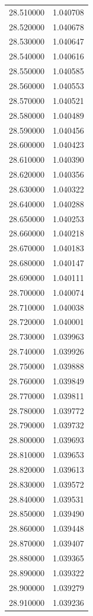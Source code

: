 \begin{tabular}{rr}
28.510000 & 1.040708 \\
28.520000 & 1.040678 \\
28.530000 & 1.040647 \\
28.540000 & 1.040616 \\
28.550000 & 1.040585 \\
28.560000 & 1.040553 \\
28.570000 & 1.040521 \\
28.580000 & 1.040489 \\
28.590000 & 1.040456 \\
28.600000 & 1.040423 \\
28.610000 & 1.040390 \\
28.620000 & 1.040356 \\
28.630000 & 1.040322 \\
28.640000 & 1.040288 \\
28.650000 & 1.040253 \\
28.660000 & 1.040218 \\
28.670000 & 1.040183 \\
28.680000 & 1.040147 \\
28.690000 & 1.040111 \\
28.700000 & 1.040074 \\
28.710000 & 1.040038 \\
28.720000 & 1.040001 \\
28.730000 & 1.039963 \\
28.740000 & 1.039926 \\
28.750000 & 1.039888 \\
28.760000 & 1.039849 \\
28.770000 & 1.039811 \\
28.780000 & 1.039772 \\
28.790000 & 1.039732 \\
28.800000 & 1.039693 \\
28.810000 & 1.039653 \\
28.820000 & 1.039613 \\
28.830000 & 1.039572 \\
28.840000 & 1.039531 \\
28.850000 & 1.039490 \\
28.860000 & 1.039448 \\
28.870000 & 1.039407 \\
28.880000 & 1.039365 \\
28.890000 & 1.039322 \\
28.900000 & 1.039279 \\
28.910000 & 1.039236 \\

\end{tabular}
